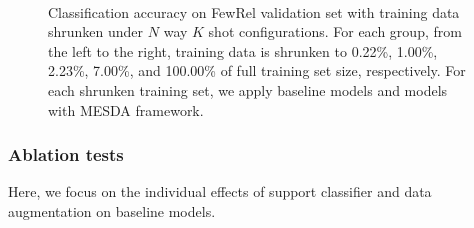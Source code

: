 \begin{figure}[htp]
\centering
\small
{}%
 \\%
%
%

\centering
\caption{Classification accuracy on FewRel validation set with training data shrunken under $N$ way $K$ shot configurations. For each group, from the left to the right, training data is shrunken to 0.22\%, 1.00\%, 2.23\%, 7.00\%, and 100.00\% of full training set size, respectively. For each shrunken training set, we apply baseline models and models with MESDA framework. }
\label{fig:analysis}
\end{figure}



\subsubsection{Ablation tests}

Here, we focus on the individual effects of support classifier and data augmentation on baseline models. %

